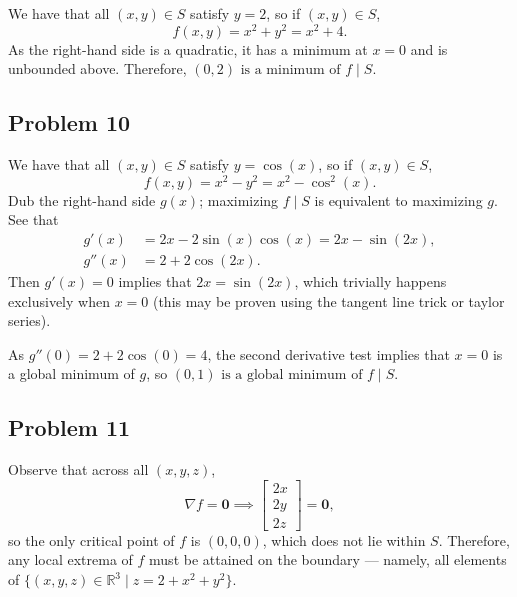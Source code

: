 \documentclass[11pt]{article}
\renewcommand{\vec}[1]{\mathbf{#1}}
\renewcommand{\grad}{\nabla}
\begin{document}
We have that all $(x, y) \in S$ satisfy $y = 2$, so if $(x, y) \in S$,
\[
	f(x, y) = x^{2} + y^{2} = x^{2} + 4.
\]
As the right-hand side is a quadratic, it has a minimum at $x = 0$ and is unbounded above. Therefore, $\boxed{\text{$(0, 2)$ is a minimum of $f \mid S$}}$.


\subsection*{Problem 10}

We have that all $(x, y) \in S$ satisfy $y = \cos(x)$, so if $(x, y) \in S$,
\[
	f(x, y) = x^{2} - y^{2} = x^{2} - \cos^{2}(x).
\]
Dub the right-hand side $g(x)$; maximizing $f \mid S$ is equivalent to maximizing $g$. See that
\begin{align*}
	g'(x) &= 2x - 2 \sin(x) \cos(x) = 2x - \sin(2x), \\
	g''(x) &= 2 + 2 \cos(2x).
\end{align*}
Then $g'(x) = 0$ implies that $2x = \sin(2x)$, which trivially happens exclusively when $x = 0$ (this may be proven using the tangent line trick or taylor series). 

As $g''(0) = 2 + 2 \cos(0) = 4$, the second derivative test implies that $x = 0$ is a global minimum of $g$, so $\boxed{\text{$(0, 1)$ is a global minimum of $f \mid S$}}$.


\subsection*{Problem 11}

Observe that across all $(x, y, z)$, 
\[
	\grad f = \vec{0} \implies \begin{bmatrix} 2x \\ 2y \\ 2z \end{bmatrix} = \vec{0},
\]
so the only critical point of $f$ is $(0, 0, 0)$, which does not lie within $S$. Therefore, any local extrema of $f$ must be attained on the boundary --- namely, all elements of $\{ (x, y, z) \in \mathbb{R}^{3} \mid z = 2 + x^{2} + y^{2} \}$.
\end{document}
